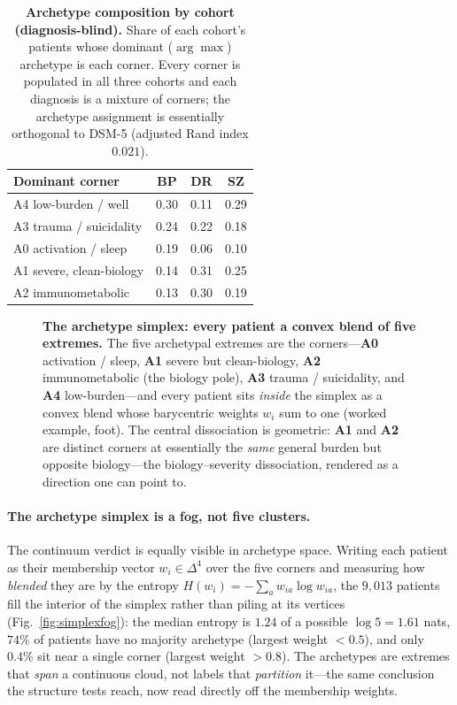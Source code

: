 \begin{table}[t]
\centering
\caption{\textbf{Archetype composition by cohort (diagnosis-blind).} Share of each cohort's
patients whose dominant ($\arg\max$) archetype is each corner. Every corner is populated in all
three cohorts and each diagnosis is a mixture of corners; the archetype assignment is essentially
orthogonal to DSM-5 (adjusted Rand index $0.021$).}
\label{tab:archcomp}
\small
\renewcommand{\arraystretch}{1.15}
\begin{tabular}{@{}l ccc@{}}
\toprule
Dominant corner & BP & DR & SZ \\
\midrule
A4 low-burden / well     & 0.30 & 0.11 & 0.29 \\
A3 trauma / suicidality  & 0.24 & 0.22 & 0.18 \\
A0 activation / sleep    & 0.19 & 0.06 & 0.10 \\
A1 severe, clean-biology & 0.14 & 0.31 & 0.25 \\
A2 immunometabolic       & 0.13 & 0.30 & 0.19 \\
\bottomrule
\end{tabular}
\end{table}

\begin{figure}[t]
  \centering
  \archetypesimplexblend
  \caption{\textbf{The archetype simplex: every patient a convex blend of five extremes.}
  The five archetypal extremes are the corners---\textbf{A0} activation / sleep,
  \textbf{A1} severe but clean-biology, \textbf{A2} immunometabolic (the biology pole),
  \textbf{A3} trauma / suicidality, and \textbf{A4} low-burden---and every patient sits
  \emph{inside} the simplex as a convex blend whose barycentric weights $w_i$ sum to one
  (worked example, foot). The central dissociation is geometric: \textbf{A1} and
  \textbf{A2} are distinct corners at essentially the \emph{same} general burden but
  opposite biology---the biology--severity dissociation, rendered as a direction one can point to.}
  \label{fig:archetypes}
\end{figure}

\paragraph{The archetype simplex is a fog, not five clusters.} The continuum verdict is equally
visible in archetype space. Writing each patient as their membership vector $w_i\in\Delta^{4}$
over the five corners and measuring how \emph{blended} they are by the entropy
$H(w_i)=-\sum_{a}w_{ia}\log w_{ia}$, the $9{,}013$ patients fill the interior of the simplex
rather than piling at its vertices (Fig.~\ref{fig:simplexfog}): the median entropy is $1.24$ of a
possible $\log 5 = 1.61$ nats, $74\%$ of patients have no majority archetype (largest weight
$<0.5$), and only $0.4\%$ sit near a single corner (largest weight $>0.8$). The archetypes are
extremes that \emph{span} a continuous cloud, not labels that \emph{partition} it---the same
conclusion the structure tests reach, now read directly off the membership weights.

